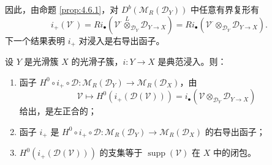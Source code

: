 因此，由命题 \ref{prop:4.6.1}，对 $D^b(\mathcal{M}_R(\mathcal{D}_Y))$ 中任意有界复形有
$$i_+(\mathcal{V}^\cdot)=Ri_\bullet(\mathcal{V}^\cdot\overset{L}{\otimes}_{\mathcal{D}_Y}\mathcal{D}_{Y\to X})
=Ri_\bullet(\mathcal{V}^\cdot\otimes_{\mathcal{D}_Y}\mathcal{D}_{Y\to X}).$$
下一个结果表明 $i_+$ 对浸入是右导出函子。

\begin{theorem}\label{thm:4.6.4}
设 $Y$ 是光滑簇 $X$ 的光滑子簇，$i:Y\to X$ 是典范浸入。则：
\begin{enumerate}[label=(\roman*)]
  \item 函子 $H^0\circ i_+\circ\mathcal{D}:\mathcal{M}_R(\mathcal{D}_Y)\to\mathcal{M}_R(\mathcal{D}_X)$，由
    $$\mathcal{V}\longmapsto H^0(i_+(\mathcal{D}(\mathcal{V})))
    =i_\bullet(\mathcal{V}\otimes_{\mathcal{D}_Y}\mathcal{D}_{Y\to X})$$
    给出，是左正合的；
  \item 函子 $i_+$ 是 $H^0\circ i_+\circ\mathcal{D}:\mathcal{M}_R(\mathcal{D}_Y)\to\mathcal{M}_R(\mathcal{D}_X)$ 的右导出函子；
  \item $H^0(i_+(\mathcal{D}(\mathcal{V})))$ 的支集等于 $\operatorname{supp}(\mathcal{V})$ 在 $X$ 中的闭包。
\end{enumerate}
\end{theorem}

